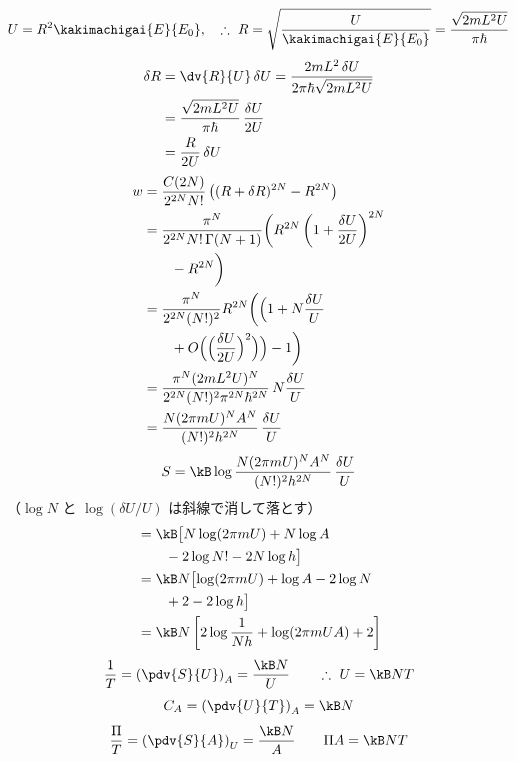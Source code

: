 \[ U=R^{2}\kakimachigai{E}{E_{0}},\quad\therefore\ R=\sqrt{\frac{U}{\kakimachigai{E}{E_{0}}}}=\frac{\sqrt{2mL^{2}U}}{\pi\hbar} \]
\begin{align*}
\delta R&=\dv{R}{U}\,\delta U=\frac{2mL^{2}\,\delta U}{2\pi\hbar\sqrt{2mL^{2}U}}\\
&=\frac{\sqrt{2mL^{2}U}}{\pi\hbar}\,\frac{\delta U}{2U}\\
&=\frac{R}{2U}\,\delta U
\end{align*}
\begin{align*}
w&=\frac{C(2N)}{2^{2N}N!}\left((R+\delta R)^{2N}-R^{2N}\right)\\
&=\frac{\pi^{N}}{2^{2N}N!\,\Gamma(N+1)}\biggl(R^{2N}\left(1+\frac{\delta U}{2U}\right)^{2N}\\
&\qquad-R^{2N}\biggr)\\
&=\frac{\pi^{N}}{2^{2N}(N!)^{2}}R^{2N}\biggl(\Bigl(1+N\frac{\delta U}{U}\\
&\qquad+O\Bigl(\Bigl(\frac{\delta U}{2U}\Bigr)^{2}\Bigr)\Bigr)-1\biggr)\\
&=\frac{\pi^{N}(2mL^{2}U)^{N}}{2^{2N}(N!)^{2}\pi^{2N}\hbar^{2N}}\,N\frac{\delta U}{U}\\
&=\frac{N(2\pi mU)^{N}A^{N}}{(N!)^{2}h^{2N}}\,\frac{\delta U}{U}
\end{align*}
\[ S=\kB\log\frac{N(2\pi mU)^{N}A^{N}}{(N!)^{2}h^{2N}}\,\frac{\delta U}{U} \]
（$\log N$ と $\log(\delta U/U)$ は斜線で消して落とす）
\begin{align*}
&=\kB\bigl[N\log(2\pi mU)+N\log A\\
&\qquad-2\log N!-2N\log h\bigr]\\
&=\kB N\bigl[\log(2\pi mU)+\log A-2\log N\\
&\qquad+2-2\log h\bigr]\\
&=\kB N\left[2\log\frac{1}{Nh}+\log(2\pi mUA)+2\right]
\end{align*}
\[ \frac{1}{T}=\left(\pdv{S}{U}\right)_{A}=\frac{\kB N}{U}\qquad\therefore\ U=\kB NT \]
\[ C_{A}=\left(\pdv{U}{T}\right)_{A}=\kB N \]
\[ \frac{\Pi}{T}=\left(\pdv{S}{A}\right)_{U}=\frac{\kB N}{A}\qquad\Pi A=\kB NT \]
